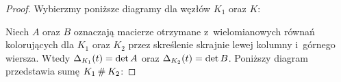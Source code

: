\begin{proof}
    Wybierzmy poniższe diagramy dla węzłów $K_1$ oraz $K$:
\begin{comment}
    \[\begin{tikzpicture}[baseline=-0.65ex, scale=0.07]
    \begin{knot}[clip width=7, end tolerance=1pt]
        \strand[thick] (-70, -20) rectangle (-30, 20);
        \strand[thick] (30, -20) rectangle ( 70, 20);
        \strand[thick] (-10, -10) [in=right, out=left] to (-25, 10);
        \strand[thick,-latex] (-25, 10) to (-30, 10);
        \strand[thick] (-30,-10) [in=left, out=right] to (-25, -10) to (-10, 10);
        \strand[thick] (-10, 10) [in=up, out=right] to (-5, 0) [in=right, out=down] to (-10, -10);

        \strand[thick] (30, 10) [in=right, out=left] to (25, 10) to (10, -10);
        \strand[thick,latex-] (30, -10) [in=right, out=left] to (25, -10) to (10, 10);
        \strand[thick] (10, 10) [in=up, out=left] to (5, 0) [in=left, out=down] to (10, -10);

        \node[darkblue] at (-50,10) [below] {$x_1,\ldots,x_{m-1}$};
        \node[red] at (-50,-10) [above] {$1,\ldots,m$};

        \node[darkblue] at (50,10) [below] {$y_1,\ldots,y_{n-1}$};
        \node[red] at (50,-10) [above] {$1,\ldots,n$};

        \node[darkblue] at (-20,-10)[below] {$x_m$};
        \node[darkblue] at (-10, 10)[above] {$x_0$};
        \node[darkblue] at (25,-10)[below] {$y_n$};
        \node[darkblue] at (10,10)[above] {$y_0$};
        \node[red] at ( 20,  0)[right]{$0$};
        \node[red] at (-20,  0)[left]{$0$};
    \end{knot}
    \end{tikzpicture}\]
\end{comment}
    Niech $A$ oraz $B$ oznaczają macierze otrzymane z~wielomianowych równań kolorujących dla $K_1$ oraz $K_2$ przez skreślenie skrajnie lewej kolumny i~górnego wiersza.
    Wtedy $\Delta_{K_1}(t) = \det A$ oraz $\Delta_{K_2}(t) = \det B$.
    Poniższy diagram przedstawia sumę $K_1 \mathbin{\#} K_2$:

\begin{comment}
    \[\begin{tikzpicture}[baseline=-0.65ex, scale=0.07]
        \begin{knot}[clip width=5, end tolerance=1pt]
            \strand[thick] (-70, -20) rectangle (-30, 20);
            \strand[thick] (30, -20) rectangle ( 70, 20);
            \strand[thick] (-10, -10) [in=right, out=left] to (-25, 10);
            \strand[thick,-latex] (-25, 10) to (-30, 10);
            \strand[thick] (-30,-10) [in=left, out=right] to (-25, -10) to (-10, 10);
            \strand[thick] (-10, -10) to (10, -10);
            \strand[thick] (-10, 10) to (10, 10);


\end{comment}
\end{proof}
